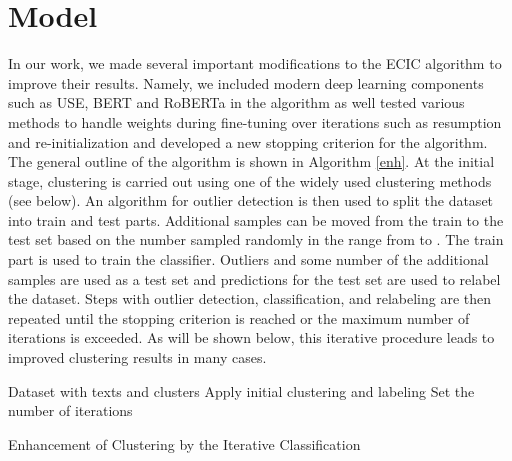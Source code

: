 \documentclass[11pt,a4paper]{article}
\begin{document}
\section{Model}
In our work, we made several important modifications to the ECIC algorithm\cite{rakib2020enhancement} to improve their results. Namely, we included modern deep learning components such as USE, BERT and RoBERTa in the algorithm as well tested various methods to handle weights during fine-tuning over iterations such as resumption and re-initialization and developed a new stopping criterion for the algorithm.  The general outline of the algorithm is shown in Algorithm \ref{enh}. At the initial stage, clustering is carried out using one of the widely used clustering methods (see below). An algorithm for outlier detection is then used to split the dataset into train and test parts. Additional samples can be moved from the train to the test set based on the  number sampled randomly in the range from  to . The train part is used to train the classifier. Outliers and some number of the additional samples are used as a test set and predictions for the test set are used to relabel the dataset. Steps with outlier detection, classification, and relabeling are then repeated until the stopping criterion is reached or the maximum number of iterations is exceeded. As will be shown below, this iterative procedure leads to improved clustering results in many cases.

\begin{algorithm}
\label{enh}
\SetAlgoLined
{}
 Dataset  with  texts and  clusters\;
 Apply initial clustering and labeling \;
 Set the number of iterations \;
\caption{Enhancement of Clustering by the Iterative Classification}
\end{algorithm}
\end{document}
